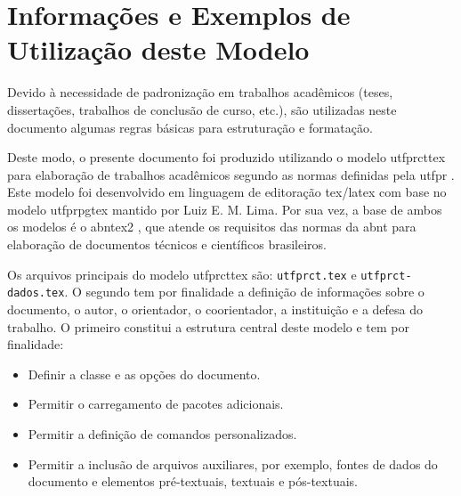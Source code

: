 
\chapter{Informações e Exemplos de Utilização deste Modelo}\label{cap:exemplo}

Devido à necessidade de padronização em trabalhos acadêmicos (teses, dissertações, trabalhos de conclusão de curso, etc.), são utilizadas neste documento algumas regras básicas para estruturação e formatação.

Deste modo, o presente documento foi produzido utilizando o modelo \gls{utfprcttex} para elaboração de trabalhos acadêmicos segundo as normas definidas pela \gls{utfpr} \cite{UTFPR2017}. Este modelo foi desenvolvido em linguagem de editoração \gls{tex}/\gls{latex} com base no modelo \gls{utfprpgtex} \cite{LIMA2019} mantido por Luiz E. M. Lima. Por sua vez, a base de ambos os modelos é o \gls{abntex2} \cite{abnTeX2:2013}, que atende os requisitos das normas da \gls{abnt} para elaboração de documentos técnicos e científicos brasileiros.

Os arquivos principais do modelo \gls{utfprcttex} são: \texttt{utfprct.tex} e \texttt{utfprct-dados.tex}. O segundo tem por finalidade a definição de informações sobre o documento, o autor, o orientador, o coorientador, a instituição e a defesa do trabalho. O primeiro constitui a estrutura central deste modelo e tem por finalidade:

\begin{itemize}%
\item Definir a classe e as opções do documento.
\item Permitir o carregamento de pacotes adicionais.
\item Permitir a definição de comandos personalizados.
\item Permitir a inclusão de arquivos auxiliares, por exemplo, fontes de dados do documento e elementos pré-textuais, textuais e pós-textuais.
\end{itemize}

